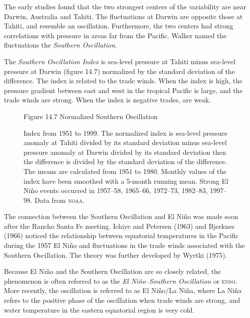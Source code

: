 The early studies found that the two strongest centers of the
variability are near Darwin, Australia and Tahiti. The fluctuations at
Darwin are opposite those at Tahiti, and resemble an
oscillation. Furthermore, the two centers had strong correlations with
pressure in areas far from the Pacific. Walker named the fluctuations
the \textit{Southern Oscillation}.

The \textit{Southern Oscillation Index} is sea-level pressure at Tahiti minus
sea-level pressure at Darwin (figure 14.7) normalized by the standard
deviation of the difference. The index is related to the trade
winds. When the index is high, the pressure gradient between east and
west in the tropical Pacific is large, and the trade winds are
strong. When the index is negative trades, are weak.

\begin{figure}[t!]
\footnotesize
Figure 14.7 Normalized Southern Oscillation \rule{0pt}{3ex}Index from
1951 to 1999. The normalized index is sea-level pressure anomaly at
Tahiti divided by its standard deviation minus sea-level pressure
anomaly at Darwin divided by its standard deviation then the
difference is divided by the standard deviation of the difference. The
means are calculated from 1951 to 1980. Monthly values of the index
have been smoothed with a 5-month running mean. Strong El Ni\~{n}o
events occurred in 1957--58, 1965--66, 1972--73, 1982--83,
1997--98. Data from \textsc{noaa}.
\label{fig:soi}
\vspace{-3ex}
\end{figure}

The connection between the Southern Oscillation and El Ni\~{n}o was made soon after the Rancho Santa Fe
meeting. Ichiye and Petersen (1963) and Bjerknes (1966) noticed the
relationship between equatorial temperatures in the Pacific during the
1957 El Ni\~{n}o and fluctuations in the trade winds associated with
the Southern Oscillation. The theory was further developed by Wyrtki
(1975).

Because El Ni\~{n}o and the Southern Oscillation are so closely related, the phenomenon is often
referred to as the \textit{El Ni\~{n}o--Southern
  Oscillation} or \textsc{enso}. More recently, the
oscillation is referred to as El Ni\~{n}o/La Ni\~{n}a, where La
Ni\~{n}a refers to the positive phase of the oscillation when trade
winds are strong, and water temperature in the eastern equatorial
region is very cold.

